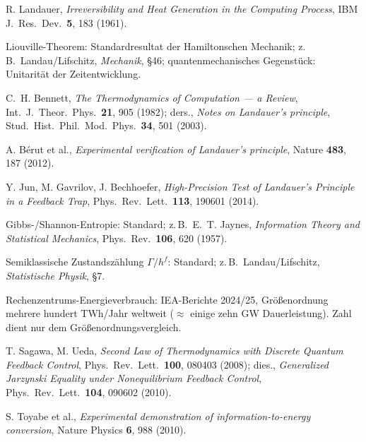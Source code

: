 \begingroup
\small
\begin{description}[leftmargin=3.2em,style=sameline,itemsep=0.3em]

\item[{[B1]}] R. Landauer, \emph{Irreversibility and Heat Generation in the
Computing Process}, IBM J.\ Res.\ Dev.\ \textbf{5}, 183 (1961).

\item[{[B2]}] Liouville-Theorem: Standardresultat der Hamiltonschen Mechanik;
z.\,B.\ Landau/Lifschitz, \emph{Mechanik}, §46; quantenmechanisches Gegenstück:
Unitarität der Zeitentwicklung.

\item[{[B3]}] C.~H. Bennett, \emph{The Thermodynamics of Computation --- a
Review}, Int.\ J.\ Theor.\ Phys.\ \textbf{21}, 905 (1982); ders., \emph{Notes on
Landauer's principle}, Stud.\ Hist.\ Phil.\ Mod.\ Phys.\ \textbf{34}, 501 (2003).

\item[{[B4]}] A. Bérut et al., \emph{Experimental verification of Landauer's
principle}, Nature \textbf{483}, 187 (2012).

\item[{[B5]}] Y. Jun, M. Gavrilov, J. Bechhoefer, \emph{High-Precision Test of
Landauer's Principle in a Feedback Trap}, Phys.\ Rev.\ Lett.\ \textbf{113},
190601 (2014).

\item[{[B6]}] Gibbs-/Shannon-Entropie: Standard; z.\,B.\ E.~T. Jaynes,
\emph{Information Theory and Statistical Mechanics}, Phys.\ Rev.\ \textbf{106},
620 (1957).

\item[{[B7]}] Semiklassische Zustandszählung $\Gamma/h^f$: Standard; z.\,B.\
Landau/Lifschitz, \emph{Statistische Physik}, §7.

\item[{[B8]}] Rechenzentrums-Energieverbrauch: IEA-Berichte 2024/25,
Größenordnung mehrere hundert TWh/Jahr weltweit ($\approx$ einige zehn GW
Dauerleistung). Zahl dient nur dem Größenordnungsvergleich.

\item[{[B9]}] T. Sagawa, M. Ueda, \emph{Second Law of Thermodynamics with
Discrete Quantum Feedback Control}, Phys.\ Rev.\ Lett.\ \textbf{100}, 080403
(2008); dies., \emph{Generalized Jarzynski Equality under Nonequilibrium Feedback
Control}, Phys.\ Rev.\ Lett.\ \textbf{104}, 090602 (2010).

\item[{[B10]}] S. Toyabe et al., \emph{Experimental demonstration of
information-to-energy conversion}, Nature Physics \textbf{6}, 988 (2010).


\end{description}
